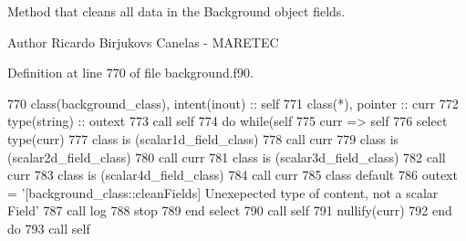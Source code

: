 Method that cleans all data in the Background object fields. 

\begin{DoxyAuthor}{Author}
Ricardo Birjukovs Canelas -\/ M\+A\+R\+E\+T\+EC 
\end{DoxyAuthor}


Definition at line 770 of file background.\+f90.


\begin{DoxyCode}
770     \textcolor{keywordtype}{class}(background\_class), \textcolor{keywordtype}{intent(inout)} :: self
771     \textcolor{keywordtype}{class}(*), \textcolor{keywordtype}{pointer} :: curr
772     \textcolor{keywordtype}{type}(string) :: outext
773     \textcolor{keyword}{call }self%
774     \textcolor{keywordflow}{do} \textcolor{keywordflow}{while}(self%
775         curr => self%
776         \textcolor{keywordflow}{select type}(curr)
777 \textcolor{keywordflow}{        class is} (scalar1d\_field\_class)
778             \textcolor{keyword}{call }curr%
779 \textcolor{keywordflow}{        class is} (scalar2d\_field\_class)
780             \textcolor{keyword}{call }curr%
781 \textcolor{keywordflow}{        class is} (scalar3d\_field\_class)
782             \textcolor{keyword}{call }curr%
783 \textcolor{keywordflow}{        class is} (scalar4d\_field\_class)
784             \textcolor{keyword}{call }curr%
785 \textcolor{keywordflow}{            class default}
786             outext = \textcolor{stringliteral}{'[background\_class::cleanFields] Unexepected type of content, not a scalar Field'}
787             \textcolor{keyword}{call }log%
788             stop
789 \textcolor{keywordflow}{        end select}
790         \textcolor{keyword}{call }self%
791         \textcolor{keyword}{nullify}(curr)
792 \textcolor{keywordflow}{    end do}
793     \textcolor{keyword}{call }self%
\end{DoxyCode}
\mbox{\label{namespacebackground__mod_ad0096fb6a5a11854fd70a7ce58dc3000}} 
